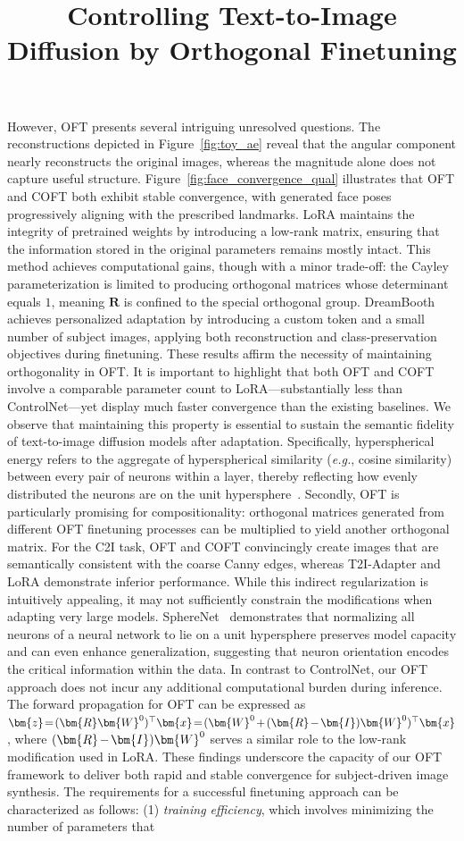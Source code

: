 \title{Controlling Text-to-Image Diffusion by Orthogonal Finetuning}
However, OFT presents several intriguing unresolved questions. The reconstructions depicted in Figure~\ref{fig:toy_ae} reveal that the angular component nearly reconstructs the original images, whereas the magnitude alone does not capture useful structure. Figure~\ref{fig:face_convergence_qual} illustrates that OFT and COFT both exhibit stable convergence, with generated face poses progressively aligning with the prescribed landmarks. LoRA maintains the integrity of pretrained weights by introducing a low-rank matrix, ensuring that the information stored in the original parameters remains mostly intact. This method achieves computational gains, though with a minor trade-off: the Cayley parameterization is limited to producing orthogonal matrices whose determinant equals $1$, meaning $\bm{R}$ is confined to the special orthogonal group. DreamBooth~\cite{ruiz2023dreambooth} achieves personalized adaptation by introducing a custom token and a small number of subject images, applying both reconstruction and class-preservation objectives during finetuning. These results affirm the necessity of maintaining orthogonality in OFT. It is important to highlight that both OFT and COFT involve a comparable parameter count to LoRA—substantially less than ControlNet—yet display much faster convergence than the existing baselines. We observe that maintaining this property is essential to sustain the semantic fidelity of text-to-image diffusion models after adaptation. Specifically, hyperspherical energy refers to the aggregate of hyperspherical similarity (\emph{e.g.}, cosine similarity) between every pair of neurons within a layer, thereby reflecting how evenly distributed the neurons are on the unit hypersphere~\cite{liu2021learning}. Secondly, OFT is particularly promising for compositionality: orthogonal matrices generated from different OFT finetuning processes can be multiplied to yield another orthogonal matrix.  For the C2I task, OFT and COFT convincingly create images that are semantically consistent with the coarse Canny edges, whereas T2I-Adapter and LoRA demonstrate inferior performance. While this indirect regularization is intuitively appealing, it may not sufficiently constrain the modifications when adapting very large models. SphereNet~\cite{liu2017deep} demonstrates that normalizing all neurons of a neural network to lie on a unit hypersphere preserves model capacity and can even enhance generalization, suggesting that neuron orientation encodes the critical information within the data. In contrast to ControlNet, our OFT approach does not incur any additional computational burden during inference. The forward propagation for OFT can be expressed as $\thickmuskip=2mu \medmuskip=2mu \bm{z}=(\bm{R}\bm{W}^0)^\top\bm{x}=(\bm{W}^0+(\bm{R}-\bm{I})\bm{W}^0)^\top\bm{x}$, where $\thickmuskip=2mu \medmuskip=2mu (\bm{R}-\bm{I})\bm{W}^0$ serves a similar role to the low-rank modification used in LoRA. These findings underscore the capacity of our OFT framework to deliver both rapid and stable convergence for subject-driven image synthesis. The requirements for a successful finetuning approach can be characterized as follows: (1) \emph{training efficiency}, which involves minimizing the number of parameters that 